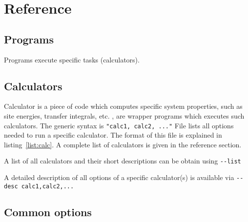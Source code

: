 \chapter{Reference}
\label{sec:reference}
\section{Programs}
\label{ref:programs}
\label{sec:programs}
Programs execute specific tasks (calculators). 

%

\section{Calculators}
\label{ref:calculators}
\label{sec:calculators}

Calculator is a piece of code which computes specific system properties, such as site energies, transfer integrals, etc. \xtprun, \kmcrun are wrapper programs which executes such calculators. The generic syntax is 
\vskip 0.2cm
{\noindent \small \xtprun \exe \texttt{"calc1, calc2, ..."} \opt \xmloptions }
\vskip 0.2cm
%
File \xmloptions lists all options needed to run a specific calculator. The format of this file is explained in listing~\ref{list:calc}. A complete list of calculators is given in the  reference section.
%


A list of all calculators and their short descriptions can be obtain using 
\vskip 0.1cm
{\noindent \small \xtprun \texttt{-{}-list} }
\vskip 0.1cm

A detailed description of all options of a specific calculator(s) is available via
\vskip 0.1cm
{\noindent \small \xtprun \texttt{-{}-desc calc1,calc2,...} }

%
\vfill

\section{Common options}
\label{ref:options}
{\small 
%
}
\vfill

